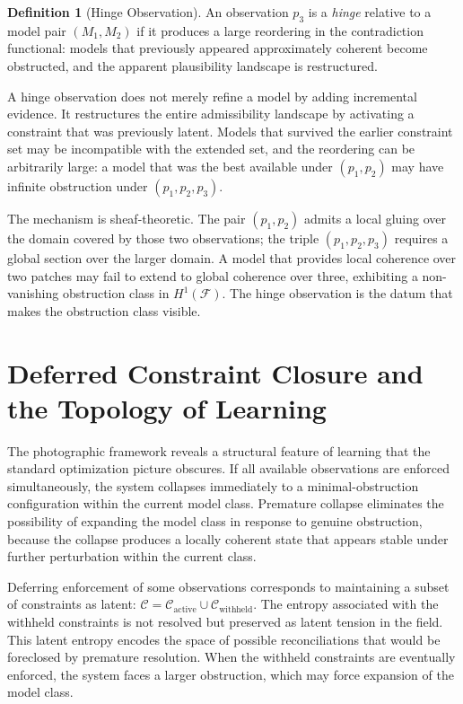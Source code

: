 \documentclass[12pt, a4paper, oneside]{article}
\theoremstyle{plain}
\theoremstyle{definition}
\newtheorem{definition}[theorem]{Definition}
\theoremstyle{remark}
\newcommand{\C}{\mathcal{C}}
\begin{document}
\begin{definition}[Hinge Observation]
An observation $p_3$ is a \emph{hinge} relative to a model pair $(M_1, M_2)$ if it produces a large reordering in the contradiction functional: models that previously appeared approximately coherent become obstructed, and the apparent plausibility landscape is restructured.
\end{definition}

A hinge observation does not merely refine a model by adding incremental evidence. It restructures the entire admissibility landscape by activating a constraint that was previously latent. Models that survived the earlier constraint set may be incompatible with the extended set, and the reordering can be arbitrarily large: a model that was the best available under $(p_1, p_2)$ may have infinite obstruction under $(p_1, p_2, p_3)$.

The mechanism is sheaf-theoretic. The pair $(p_1, p_2)$ admits a local gluing over the domain covered by those two observations; the triple $(p_1, p_2, p_3)$ requires a global section over the larger domain. A model that provides local coherence over two patches may fail to extend to global coherence over three, exhibiting a non-vanishing obstruction class in $H^1(\mathcal{F})$. The hinge observation is the datum that makes the obstruction class visible.

\section{Deferred Constraint Closure and the Topology of Learning}

The photographic framework reveals a structural feature of learning that the standard optimization picture obscures. If all available observations are enforced simultaneously, the system collapses immediately to a minimal-obstruction configuration within the current model class. Premature collapse eliminates the possibility of expanding the model class in response to genuine obstruction, because the collapse produces a locally coherent state that appears stable under further perturbation within the current class.

Deferring enforcement of some observations corresponds to maintaining a subset of constraints as latent: $\C = \C_{\mathrm{active}} \cup \C_{\mathrm{withheld}}$. The entropy associated with the withheld constraints is not resolved but preserved as latent tension in the field. This latent entropy encodes the space of possible reconciliations that would be foreclosed by premature resolution. When the withheld constraints are eventually enforced, the system faces a larger obstruction, which may force expansion of the model class.
\end{document}

